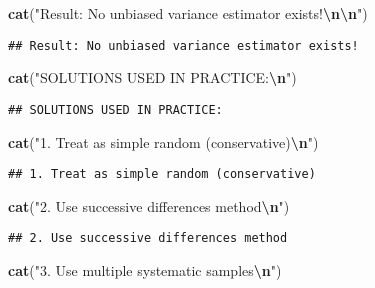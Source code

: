 \documentclass[
]{article}
\newenvironment{Shaded}{\begin{snugshade}}{\end{snugshade}}
\newcommand{\FunctionTok}[1]{\textcolor[rgb]{0.13,0.29,0.53}{\textbf{#1}}}
\newcommand{\NormalTok}[1]{#1}
\newcommand{\SpecialCharTok}[1]{\textcolor[rgb]{0.81,0.36,0.00}{\textbf{#1}}}
\newcommand{\StringTok}[1]{\textcolor[rgb]{0.31,0.60,0.02}{#1}}
\begin{document}
\begin{Shaded}
\begin{Highlighting}[]
\FunctionTok{cat}\NormalTok{(}\StringTok{"Result: No unbiased variance estimator exists!}\SpecialCharTok{\textbackslash{}n\textbackslash{}n}\StringTok{"}\NormalTok{)}
\end{Highlighting}
\end{Shaded}

\begin{verbatim}
## Result: No unbiased variance estimator exists!
\end{verbatim}

\begin{Shaded}
\begin{Highlighting}[]
\FunctionTok{cat}\NormalTok{(}\StringTok{"SOLUTIONS USED IN PRACTICE:}\SpecialCharTok{\textbackslash{}n}\StringTok{"}\NormalTok{)}
\end{Highlighting}
\end{Shaded}

\begin{verbatim}
## SOLUTIONS USED IN PRACTICE:
\end{verbatim}

\begin{Shaded}
\begin{Highlighting}[]
\FunctionTok{cat}\NormalTok{(}\StringTok{"1. Treat as simple random (conservative)}\SpecialCharTok{\textbackslash{}n}\StringTok{"}\NormalTok{)}
\end{Highlighting}
\end{Shaded}

\begin{verbatim}
## 1. Treat as simple random (conservative)
\end{verbatim}

\begin{Shaded}
\begin{Highlighting}[]
\FunctionTok{cat}\NormalTok{(}\StringTok{"2. Use successive differences method}\SpecialCharTok{\textbackslash{}n}\StringTok{"}\NormalTok{)}
\end{Highlighting}
\end{Shaded}

\begin{verbatim}
## 2. Use successive differences method
\end{verbatim}

\begin{Shaded}
\begin{Highlighting}[]
\FunctionTok{cat}\NormalTok{(}\StringTok{"3. Use multiple systematic samples}\SpecialCharTok{\textbackslash{}n}\StringTok{"}\NormalTok{)}
\end{Highlighting}
\end{Shaded}
\end{document}
